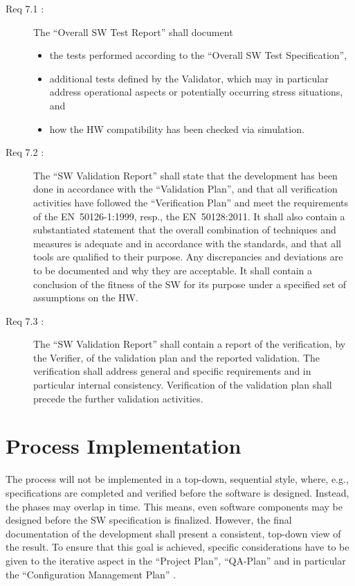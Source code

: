 \documentclass{template/openetcs_article}
\begin{document}
\begin{description}
\item[Req 7.1 {\cite[7.7.4.1 to 7.7.4.4]{EN50128:2011}}:] The
  ``Overall SW Test Report'' shall document
  \begin{itemize}
  \item the tests performed according to the ``Overall SW Test
    Specification'',
  \item additional tests defined by the Validator, which may in
    particular address operational aspects or potentially occurring
    stress situations, and
  \item how the HW compatibility has been checked via simulation.
  \end{itemize}
%
\item[Req 7.2 {\cite[7.7.4.6 to 7.7.4.11]{EN50128:2011}}:] The ``SW
  Validation Report'' shall state that the development has been done
  in accordance with the ``Validation Plan'', and that all
  verification activities have followed the ``Verification Plan'' and
  meet the requirements of the EN~50126-1:1999, resp., the
  EN~50128:2011. It shall also contain a substantiated statement that
  the overall combination of techniques and measures is adequate and
  in accordance with the standards, and that all tools are qualified
  to their purpose. Any discrepancies and deviations are to be
  documented and why they are acceptable. It shall contain a
  conclusion of the fitness of the SW for its purpose under a
  specified set of assumptions on the HW.
\item[Req 7.3 {\cite[6.3.4.13 to 6.3.4.14]{EN50128:2011}}:] The ``SW
  Validation Report'' shall contain a report of the verification, by
  the Verifier, of the validation plan and the reported
  validation. The verification shall address general and specific
  requirements and in particular internal consistency. Verification of
  the validation plan shall precede the further validation activities.
\end{description}

\section{Process Implementation}
\label{sec:proc-impl}

The process will not be implemented in a top-down, sequential style,
where, e.g., specifications are completed and verified before the
software is designed. Instead, the phases may overlap in time. This
means, even software components may be designed before the SW
specification is finalized. However, the final documentation of the
development shall present a consistent, top-down view of the
result. To ensure that this goal is achieved, specific considerations
have to be given to the iterative aspect in the ``Project Plan'',
``QA-Plan'' and in particular the ``Configuration Management Plan'' .
\end{document}
